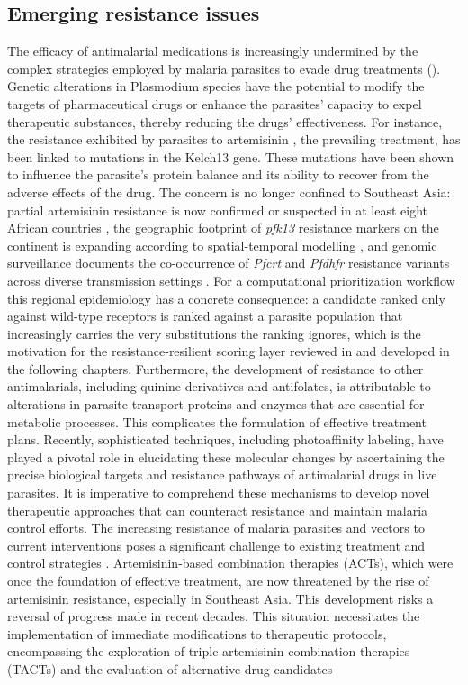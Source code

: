 \subsection{Emerging resistance issues}
The efficacy of antimalarial medications is increasingly undermined by the complex strategies employed by malaria parasites to evade drug treatments (). Genetic alterations in Plasmodium species have the potential to modify the targets of pharmaceutical drugs or enhance the parasites' capacity to expel therapeutic substances, thereby reducing the drugs' effectiveness. For instance, the resistance exhibited by parasites to artemisinin \cite{Folake2018,Kakde2023}, the prevailing treatment, has been linked to mutations in the Kelch13 gene. These mutations have been shown to influence the parasite's protein balance and its ability to recover from the adverse effects of the drug. The concern is no longer confined to Southeast Asia: partial artemisinin resistance is now confirmed or suspected in at least eight African countries \cite{artemisinin_partial_resistance}, the geographic footprint of \emph{pfk13} resistance markers on the continent is expanding according to spatial-temporal modelling \cite{young2026artemisinin}, and genomic surveillance documents the co-occurrence of \emph{Pfcrt} and \emph{Pfdhfr} resistance variants across diverse transmission settings \cite{letebo2026surveillance,africa_resistance_2026,pfk13_resistance_2026,global_resistance_landscape_2026}. For a computational prioritization workflow this regional epidemiology has a concrete consequence: a candidate ranked only against wild-type receptors is ranked against a parasite population that increasingly carries the very substitutions the ranking ignores, which is the motivation for the resistance-resilient scoring layer reviewed in  and developed in the following chapters. Furthermore, the development of resistance to other antimalarials, including quinine derivatives and antifolates, is attributable to alterations in parasite transport proteins and enzymes that are essential for metabolic processes. This complicates the formulation of effective treatment plans. Recently, sophisticated techniques, including photoaffinity labeling, have played a pivotal role in elucidating these molecular changes by ascertaining the precise biological targets and resistance pathways of antimalarial drugs in live parasites. It is imperative to comprehend these mechanisms to develop novel therapeutic approaches that can counteract resistance and maintain malaria control efforts. The increasing resistance of malaria parasites and vectors to current interventions poses a significant challenge to existing treatment and control strategies \cite{Sinha2014}. Artemisinin-based combination therapies (ACTs), which were once the foundation of effective treatment, are now threatened by the rise of artemisinin resistance, especially in Southeast Asia. This development risks a reversal of progress made in recent decades. This situation necessitates the implementation of immediate modifications to therapeutic protocols, encompassing the exploration of triple artemisinin combination therapies (TACTs) and the evaluation of alternative drug candidates 